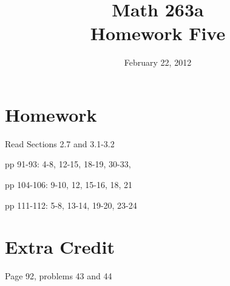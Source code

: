 \documentclass{exam}
\title{Math 263a \\ Homework Five}
\date{February 22, 2012}
\begin{document}
\maketitle

\section{Homework}

\begin{itemize*}
  \item Read Sections 2.7 and 3.1-3.2
  \item pp 91-93: 4-8, 12-15, 18-19, 30-33, 
  \item pp 104-106: 9-10, 12, 15-16, 18, 21
  \item pp 111-112: 5-8, 13-14, 19-20, 23-24
\end{itemize*}

\section{Extra Credit}
Page 92, problems 43 and 44
\end{document}

